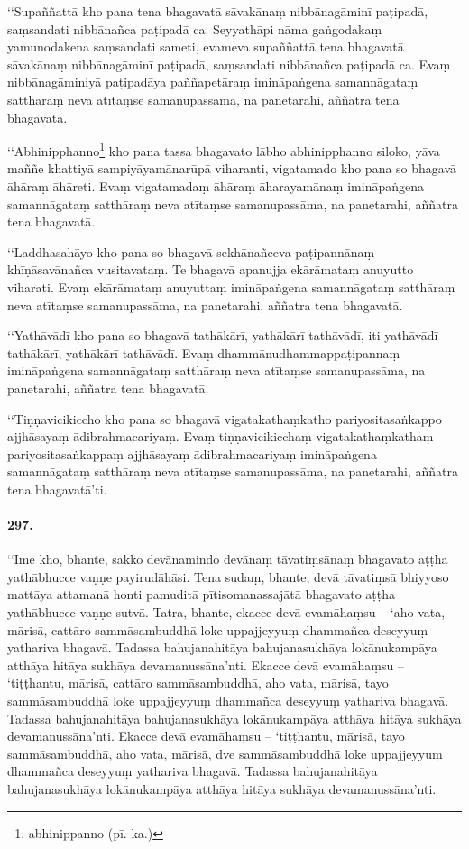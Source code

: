 ‘‘Supaññattā kho pana tena bhagavatā sāvakānaṃ nibbānagāminī paṭipadā, saṃsandati nibbānañca paṭipadā ca. Seyyathāpi nāma gaṅgodakaṃ yamunodakena saṃsandati sameti, evameva supaññattā tena bhagavatā sāvakānaṃ nibbānagāminī paṭipadā, saṃsandati nibbānañca paṭipadā ca. Evaṃ nibbānagāminiyā paṭipadāya paññapetāraṃ imināpaṅgena samannāgataṃ satthāraṃ neva atītaṃse samanupassāma, na panetarahi, aññatra tena bhagavatā.

‘‘Abhinipphanno\footnote{abhinippanno (pī. ka.)} kho pana tassa bhagavato lābho abhinipphanno siloko, yāva maññe khattiyā sampiyāyamānarūpā viharanti, vigatamado kho pana so bhagavā āhāraṃ āhāreti. Evaṃ vigatamadaṃ āhāraṃ āharayamānaṃ imināpaṅgena samannāgataṃ satthāraṃ neva atītaṃse samanupassāma, na panetarahi, aññatra tena bhagavatā.

‘‘Laddhasahāyo kho pana so bhagavā sekhānañceva paṭipannānaṃ khīṇāsavānañca vusitavataṃ. Te bhagavā apanujja ekārāmataṃ anuyutto viharati. Evaṃ ekārāmataṃ anuyuttaṃ imināpaṅgena samannāgataṃ satthāraṃ neva atītaṃse samanupassāma, na panetarahi, aññatra tena bhagavatā.

‘‘Yathāvādī kho pana so bhagavā tathākārī, yathākārī tathāvādī, iti yathāvādī tathākārī, yathākārī tathāvādī. Evaṃ dhammānudhammappaṭipannaṃ imināpaṅgena samannāgataṃ satthāraṃ neva atītaṃse samanupassāma, na panetarahi, aññatra tena bhagavatā.

‘‘Tiṇṇavicikiccho kho pana so bhagavā vigatakathaṃkatho pariyositasaṅkappo ajjhāsayaṃ ādibrahmacariyaṃ. Evaṃ tiṇṇavicikicchaṃ vigatakathaṃkathaṃ pariyositasaṅkappaṃ ajjhāsayaṃ ādibrahmacariyaṃ imināpaṅgena samannāgataṃ satthāraṃ neva atītaṃse samanupassāma, na panetarahi, aññatra tena bhagavatā’ti.

\paragraph{297.} ‘‘Ime kho, bhante, sakko devānamindo devānaṃ tāvatiṃsānaṃ bhagavato aṭṭha yathābhucce vaṇṇe payirudāhāsi. Tena sudaṃ, bhante, devā tāvatiṃsā bhiyyoso mattāya attamanā honti pamuditā pītisomanassajātā bhagavato aṭṭha yathābhucce vaṇṇe sutvā. Tatra, bhante, ekacce devā evamāhaṃsu – ‘aho vata, mārisā, cattāro sammāsambuddhā loke uppajjeyyuṃ dhammañca deseyyuṃ yathariva bhagavā. Tadassa bahujanahitāya bahujanasukhāya lokānukampāya atthāya hitāya sukhāya devamanussāna’nti. Ekacce devā evamāhaṃsu – ‘tiṭṭhantu, mārisā, cattāro sammāsambuddhā, aho vata, mārisā, tayo sammāsambuddhā loke uppajjeyyuṃ dhammañca deseyyuṃ yathariva bhagavā. Tadassa bahujanahitāya bahujanasukhāya lokānukampāya atthāya hitāya sukhāya devamanussāna’nti. Ekacce devā evamāhaṃsu – ‘tiṭṭhantu, mārisā, tayo sammāsambuddhā, aho vata, mārisā, dve sammāsambuddhā loke uppajjeyyuṃ dhammañca deseyyuṃ yathariva bhagavā. Tadassa bahujanahitāya bahujanasukhāya lokānukampāya atthāya hitāya sukhāya devamanussāna’nti.

